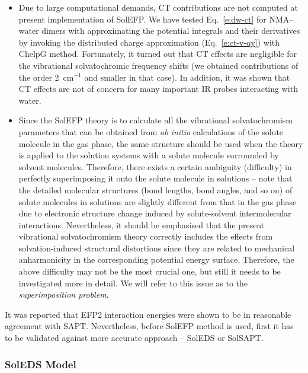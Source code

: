 \documentclass[b5paper,oneside,fleqn,11pt]{book}
\begin{document}
\begin{refsection}
\begin{itemize}
 \item Due to
large computational demands, CT contributions are not computed at present implementation
of SolEFP. We have tested Eq.~\eqref{e:dw-ct} for NMA--water dimers 
with approximating the potential integrals and their derivatives by invoking the distributed
charge approximation (Eq.~\eqref{e:ct-v-qy}) with ChelpG method. \citep{Breneman.Wiberg.JCC.1990} 
Fortunately,
it turned out that CT effects are negligible for the vibrational solvatochromic frequency shifts
(we obtained contributions of the order 2~cm$^{-1}$ and smaller in that case). In addition, it was shown
that CT effects are not of concern 
for many important IR probes interacting with water. \citep{Lee.Choi.Cho.PCCP.2010,Blasiak.Cho.JCP.2014}
 \item Since the SolEFP theory is to calculate all the vibrational solvatochromism parameters 
that can be obtained from \emph{ab initio} calculations of the solute molecule in the gas phase, 
the same structure should be used when the theory is applied to the solution systems 
with a solute molecule surrounded by solvent molecules. Therefore, there exists a certain 
ambiguity (difficulty) in perfectly superimposing it onto the solute molecule in solutions 
-- note that the detailed molecular structures (bond lengths, bond angles, and so on) 
of solute molecules in solutions are slightly different from that in the gas phase 
due to electronic structure change induced by solute\hyp{}solvent intermolecular interactions. 
Nevertheless, it should be emphasised that the present vibrational solvatochromism theory 
correctly includes the effects from solvation\hyp{}induced structural distortions 
since they are related to mechanical anharmonicity in the corresponding potential 
energy surface. Therefore, the above difficulty may not be the most crucial one, 
but still it needs to be investigated more in detail. We will refer to this issue as to
the \emph{superimposition problem}.
\end{itemize}
%
It was reported that EFP2 interaction energies were shown to be
in reasonable agreement 
with SAPT. \citep{Flick.Kosenkov.Hohenstein.Sherrill.Slipchenko.JCTC.2012} 
Nevertheless, before SolEFP method is used, first it has to be validated
against more accurate approach -- SolEDS or SolSAPT. 

\subsubsection{SolEDS Model\label{s:soleds}}


\end{refsection}
\end{document}
